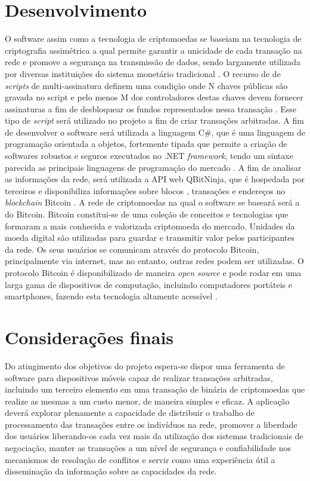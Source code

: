 \documentclass[
	article,			%
	11pt,				%
	oneside,			%
	a4paper,			%
	chapter=TITLE,		%
	section=TITLE,		%
	subsection=TITLE,	%
	subsubsection=TITLE, %
	english,			%
	brazil,				%
	sumario=tradicional
	]{ifrs-artigo-abntex2}
\begin{document}
\section{Desenvolvimento}
O software assim como a tecnologia de criptomoedas se baseiam na tecnologia de criptografia assimétrica a qual permite garantir a unicidade de cada transação na rede e promove a segurança na transmissão de dados, sendo largamente utilizada por diversas instituições do sistema monetário tradicional \cite{rouse2018}.
O recurso de de \textit{scripts} de multi-assinatura definem uma condição onde N chaves públicas são gravada no script e pelo menos M dos controladores destas chaves devem fornecer assinaturas a fim de desbloquear os fundos representados nessa transação \cite{masterBit}. Esse tipo de \textit{script} será utilizado no projeto a fim de criar transações arbitradas.
A fim de desenvolver o software será utilizada a linguagem C{\#}, que é uma linguagem de programação orientada a objetos, fortemente tipada que permite a criação de softwares robustos e seguros executados no .NET \textit{framework}, tendo um sintaxe parecida as principais linguagens de programação do mercado  \cite{wagner2015}.
A fim de analisar as informações da rede, será utilizada a API web QBitNinja, que é hospedada por terceiros e disponibiliza informações sobre blocos , transações e endereços no \textit{blockchain} Bitcoin \cite{progblockC}.
A rede de criptomoedas na qual o software se baseará será a do Bitcoin. Bitcoin constitui-se de uma  coleção de conceitos e tecnologias que formaram a mais conhecida e valorizada criptomoeda do mercado. Unidades da moeda digital são utilizadas para guardar e transmitir valor pelos participantes da rede. Os seus usuários se comunicam através do protocolo Bitcoin, principalmente via internet, mas no entanto, outras redes podem ser utilizadas. O protocolo Bitcoin é disponibilizado de maneira \textit{open source} e pode rodar em uma larga gama de dispositivos de computação, incluindo computadores portáteis e smartphones, fazendo esta tecnologia altamente acessível \cite{masterBit}.

% 

\section{Considerações finais}
Do atingimento dos objetivos do projeto espera-se dispor uma ferramenta de software para dispositivos móveis capaz de realizar transações arbitradas, incluindo um terceiro elemento em uma transação de binária de criptomoedas que realize as mesmas a um custo menor, de maneira simples e eficaz. A aplicação deverá explorar plenamente a capacidade de distribuir o trabalho de processamento das transações entre os indivíduos na rede, promover a liberdade dos usuários liberando-os cada vez mais da utilização dos sistemas tradicionais de negociação, manter as transações  a um nível de segurança e confiabilidade nos mecanismos de resolução de conflitos e servir como uma experiência útil a disseminação da informação sobre as capacidades da rede.
\end{document}
